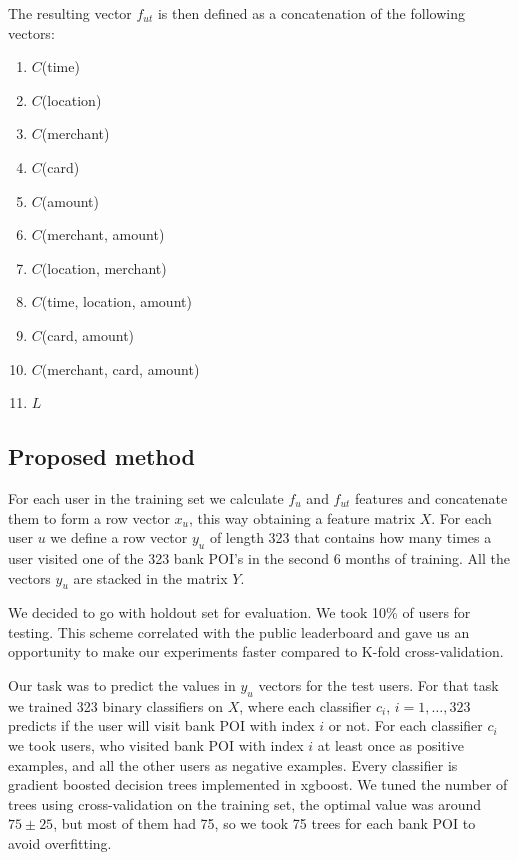 \documentclass{llncs}
\begin{document}
	The resulting vector $f_{ut}$ is then defined as a concatenation of the following vectors:
	\begin{enumerate}
		\item $C$(time)
		\item $C$(location)
		\item $C$(merchant)
		\item $C$(card)
		\item $C$(amount)
		\item $C$(merchant, amount)
		\item $C$(location, merchant)
		\item $C$(time, location, amount)
		\item $C$(card, amount)
		\item $C$(merchant, card, amount)
		\item $L$
	\end{enumerate}
	
	\subsection{Proposed method}
	
	For each user in the training set we calculate $f_u$ and $f_{ut}$ features and concatenate them to form a row vector $x_u$, this way obtaining a feature matrix $X$. For each user $u$ we define a row vector $y_u$ of length 323 that contains how many times a user visited one of the 323 bank POI's in the second 6 months of training. All the vectors $y_u$ are stacked in the matrix $Y$.
	
	We decided to go with holdout set for evaluation. We took 10\% of users for testing. This scheme correlated with the public leaderboard and gave us an opportunity to make our experiments faster compared to K-fold cross-validation.
	
	Our task was to predict the values in $y_u$ vectors for the test users. For that task we trained 323 binary classifiers on $X$, where each classifier $c_i$, $i=1,\ldots,323$ predicts if the user will visit bank POI with index $i$ or not. For each classifier $c_i$ we took users, who visited bank POI with index $i$ at least once as positive examples, and all the other users as negative examples. Every classifier is gradient boosted decision trees \cite{fgb} implemented in xgboost. We tuned the number of trees using cross-validation on the training set, the optimal value was around $75 \pm 25$, but most of them had 75, so we took 75 trees for each bank POI to avoid overfitting.
	
\end{document}
